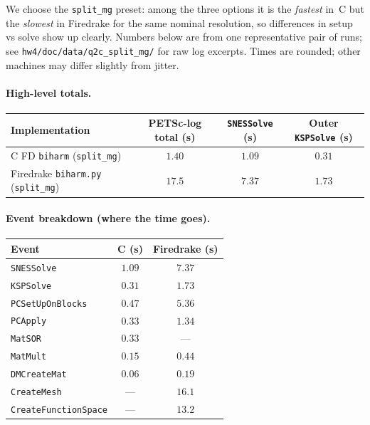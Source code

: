 \documentclass[11pt]{article}
\begin{document}
We choose the \texttt{split\_mg} preset: among the three options it is the \emph{fastest} in~C but the \emph{slowest} in Firedrake for the same nominal resolution, so differences in setup vs solve show up clearly. Numbers below are from one representative pair of runs; see \texttt{hw4/doc/data/q2c\_split\_mg/} for raw log excerpts. Times are rounded; other machines may differ slightly from jitter.

\paragraph{High-level totals.}
\begin{center}
\begin{tabular}{lccc}
\toprule
Implementation & PETSc-log total (s) & \texttt{SNESSolve} (s) & Outer \texttt{KSPSolve} (s) \\
\midrule
C FD \texttt{biharm} (\texttt{split\_mg}) & $1.40$ & $1.09$ & $0.31$ \\
Firedrake \texttt{biharm.py} (\texttt{split\_mg}) & $17.5$ & $7.37$ & $1.73$ \\
\bottomrule
\end{tabular}
\end{center}

\paragraph{Event breakdown (where the time goes).}
\begin{center}
\begin{tabular}{lcc}
\toprule
Event & C (s) & Firedrake (s) \\
\midrule
\texttt{SNESSolve} & $1.09$ & $7.37$ \\
\texttt{KSPSolve} & $0.31$ & $1.73$ \\
\texttt{PCSetUpOnBlocks} & $0.47$ & $5.36$ \\
\texttt{PCApply} & $0.33$ & $1.34$ \\
\texttt{MatSOR} & $0.33$ & --- \\
\texttt{MatMult} & $0.15$ & $0.44$ \\
\texttt{DMCreateMat} & $0.06$ & $0.19$ \\
\texttt{CreateMesh} & --- & $16.1$ \\
\texttt{CreateFunctionSpace} & --- & $13.2$ \\
\bottomrule
\end{tabular}
\end{center}
\end{document}
